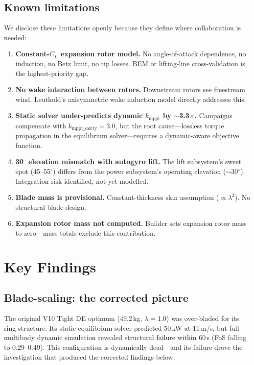 \documentclass[11pt,a4paper]{article}
\begin{document}
\subsection{Known limitations}

We disclose these limitations openly because they define where collaboration is needed:

\begin{enumerate}
\item \textbf{Constant-$C_L$ expansion rotor model.} No angle-of-attack dependence, no induction, no Betz limit, no tip losses.
BEM or lifting-line cross-validation is the highest-priority gap.
\item \textbf{No wake interaction between rotors.} Downstream rotors see freestream wind.
Leuthold's axisymmetric wake induction model \cite{leuthold2019} directly addresses this.
\item \textbf{Static solver under-predicts dynamic $k_{\text{mppt}}$ by $\sim$3.3$\times$.}
Campaigns compensate with $k_{\text{mppt\_safety}} = 3.0$, but the root cause---lossless torque propagation in the equilibrium solver---requires a dynamic-aware objective function.
\item \textbf{30$^\circ$ elevation mismatch with autogyro lift.}
The lift subsystem's sweet spot (45--55$^\circ$) differs from the power subsystem's operating elevation ($\sim$30$^\circ$).
Integration risk identified, not yet modelled.
\item \textbf{Blade mass is provisional.} Constant-thickness skin assumption ($\propto \lambda^2$).
No structural blade design.
\item \textbf{Expansion rotor mass not computed.} Builder sets expansion rotor mass to zero---mass totals exclude this contribution.
\end{enumerate}

\section{Key Findings}
\label{sec:findings}

\subsection{Blade-scaling: the corrected picture}

The original V10 Tight DE optimum (49.2\,kg, $\lambda = 1.0$) was over-bladed for its ring structure.
Its static equilibrium solver predicted 50\,kW at 11\,m/s, but full multibody dynamic simulation revealed structural failure within 60\,s (FoS falling to 0.29--0.49).
This configuration is dynamically dead---and its failure drove the investigation that produced the corrected findings below.
\end{document}
